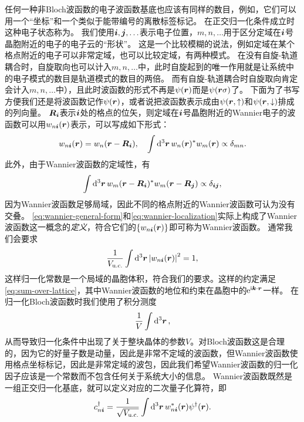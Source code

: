 任何一种非Bloch波函数的电子波函数基底也应该有同样的数目，例如，它们可以用一个“坐标”和一个类似于能带编号的离散标签标记。
在正交归一化条件成立时这种电子状态称为。
我们使用$\vb*{i}, \vb*{j}, \ldots$表示电子位置，$m, n, \ldots$用于区分定域在$\vb*{i}$号晶胞附近的电子的电子云的“形状”。
这是一个比较模糊的说法，例如定域在某个格点附近的电子可以非常定域，也可以比较定域，有两种模式。
在没有自旋-轨道耦合时，自旋取向也可以计入$m, n, \ldots$中，此时自旋起到的唯一作用就是让系统中的电子模式的数目是轨道模式的数目的两倍。
而有自旋-轨道耦合时自旋取向肯定会计入$m, n, \ldots$中），且此时波函数的形式不再是$\psi(\vb*{r})$而是$\psi(\vb*{r} \sigma)$了。
下面为了书写方便我们还是将波函数记作$\psi(\vb*{r})$，或者说把波函数表示成由$\psi(\vb*{r}, \uparrow)$和$\psi(\vb*{r}, \downarrow)$排成的列向量。
$\vb*{R}_{\vb*{i}}$表示$\vb*{i}$处的格点的位矢，则定域在$\vb*{i}$号晶胞附近的Wannier电子的波函数可以用$w_{n\vb*{i}}(\vb*{r})$表示，可以写成如下形式：
\begin{equation}
    w_{n \vb*{i}}(\vb*{r}) = w_{n}(\vb*{r} - \vb*{R}_{\vb*{i}}), \quad \int \dd[3]{\vb*{r}} w_n(\vb*{r})^* w_m(\vb*{r}) \propto \delta_{mn}.
    \label{eq:wannier-general-form}
\end{equation}
此外，由于Wannier波函数的定域性，有
\begin{equation}
    \int \dd[3]{\vb*{r}} w_m(\vb*{r} - \vb*{R}_{\vb*{i}})^* w_m(\vb*{r} - \vb*{R}_{\vb*{j}}) \propto \delta_{\vb*{i} \vb*{j}},
    \label{eq:wannier-localization}
\end{equation}
因为Wannier波函数足够局域，因此不同的格点附近的Wannier波函数可认为没有交叠。
\eqref{eq:wannier-general-form}和\eqref{eq:wannier-localization}实际上构成了Wannier波函数这一概念的\emph{定义}，符合它们的$\{w_{n \vb*{i}}(\vb*{r})\}$即可称为Wannier波函数。
通常我们会要求
\begin{equation}
    \frac{1}{V_\text{u.c.}} \int \dd[3]{\vb*{r}} \abs{w_{n \vb*{i}}(\vb*{r})}^2 = 1,
    \label{eq:wannier-function-normalization-uc}
\end{equation}
这样归一化常数是一个局域的晶胞体积，符合我们的要求。这样的约定满足\eqref{eq:sum-over-lattice}，其中Wannier波函数的地位和约束在晶胞中的$\mathrm{e}^{\mathrm{i} \vb*{k} \cdot \vb*{r}}$一样。
在归一化Bloch波函数时我们使用了积分测度
\[
    \frac{1}{V} \int \dd[3]{\vb*{r}},
\]
从而导致归一化条件中出现了关于整块晶体的参数$V$。对Bloch波函数这是合理的，因为它的好量子数是动量，因此是非常不定域的波函数，但Wannier波函数使用格点坐标标记，因此是非常定域的波包，因此我们希望Wannier波函数的归一化因子应该是一个常数而不包含任何关于系统大小的信息。
Wannier波函数既然是一组正交归一化基底，就可以定义对应的二次量子化算符，即
\begin{equation}
    {c}^\dagger_{n \vb*{i}} = \frac{1}{\sqrt{V_\text{u.c.}}} \int \dd[3]{\vb*{r}} w_{n \vb*{i}}^*(\vb*{r}) {\psi}^\dagger(\vb*{r}).
    \label{eq:wannier-and-free}
\end{equation}

